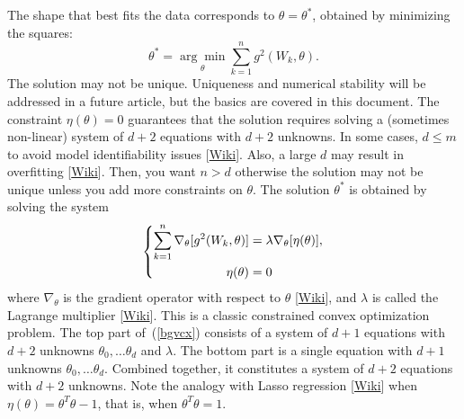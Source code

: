 \documentclass[oneside,10pt]{book}
\begin{document}
The shape that best fits the data corresponds to $\theta=\theta^*$, obtained by minimizing the squares:
\begin{equation}
\theta^* = \underset{\theta}{\arg\min} \sum_{k=1}^n g^2(W_k,\theta).\label{tyrefd}
\end{equation}
The solution may not be unique. Uniqueness and \textcolor{index}{numerical stability} will be addressed in a future article, but the basics are covered in this document. The constraint $\eta(\theta)=0$ guarantees that the solution requires solving a (sometimes non-linear)
 system of $d+2$ equations with $d+2$  unknowns. In some cases, $d\leq m$ to avoid \textcolor{index}{model identifiability} issues
 [\href{https://en.wikipedia.org/wiki/Identifiability}{Wiki}]. Also, a large $d$ may result in \textcolor{index}{overfitting}
 [\href{https://en.wikipedia.org/wiki/Overfitting}{Wiki}].  Then, you want $n > d$ otherwise the solution may  not be unique unless you add more
 constraints on $\theta$. The solution $\theta^*$ is obtained by solving the system
\begin{equation}
\centering
\left\{\begin{split}
 \sum_{k=1}^n \nabla_\theta [g^2(W_k,\theta)] & =\lambda \nabla_\theta [\eta(\theta)],\\
 \eta(\theta) & =0 \\
\end{split}\right. \label{bgvcx}
\end{equation}
where $\nabla_\theta$ is the \textcolor{index}{gradient} operator with respect to $\theta$ [\href{https://en.wikipedia.org/wiki/Gradient}{Wiki}], and $\lambda$ is called the \textcolor{index}{Lagrange multiplier} [\href{https://en.wikipedia.org/wiki/Lagrange_multiplier}{Wiki}]. This is a classic constrained convex optimization problem. The top part of~(\ref{bgvcx}) consists of a system of $d+1$ equations with $d+2$ unknowns
  $\theta_0,\dots\theta_d$ and $\lambda$. The bottom part is a single equation with $d+1$ unknowns  $\theta_0,\dots\theta_d$. Combined together,
 it constitutes a system of $d+2$ equations with $d+2$ unknowns. Note the analogy with \textcolor{index}{Lasso regression}
 [\href{https://en.wikipedia.org/wiki/Lasso_(statistics)}{Wiki}] when $\eta(\theta)=\theta^T\theta - 1$, that is, when $\theta^T\theta=1$.
\end{document}
